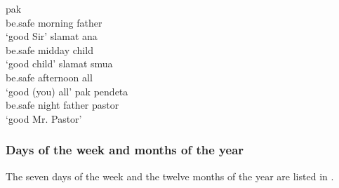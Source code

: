 \ea
\label{Example_5.75}
 {} {pak}\\ %
 be.safe  morning  father\\
\glt 
‘good  Sir’ \textstyleExampleSource{[080923-011-Cv.0002]}
\z
\ea
\label{Example_5.76}
\gll  slamat    ana\\
 be.safe  midday  child\\
\glt 
‘good  child’ \textstyleExampleSource{[080922-001a-CvPh.1260]}
\z
\ea
\label{Example_5.77}
\gll  slamat    smua\\
 be.safe  afternoon  all\\
\glt 
‘good  (you) all’ \textstyleExampleSource{[081110-002-Cv.0001]}
\z
\ea
\label{Example_5.78}
 {} {pak} {pendeta}\\ %
 be.safe  night  father  pastor\\
\glt
‘good  Mr. Pastor’ \textstyleExampleSource{[080925-003-Cv.0240]}
\z


\subsubsection[Days of the week and months of the year]{Days of the week and months of the year}
\label{Para_5.2.5.3}
The seven days of the week and the twelve months of the year are listed in .


